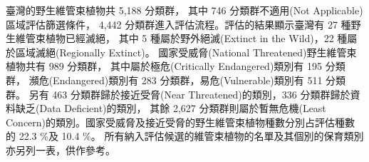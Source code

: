 
\indent 臺灣的野生維管束植物共 5,188 分類群，
其中 746 分類群不適用(Not Applicable)區域評估篩選條件，
4,442 分類群進入評估流程。評估的結果顯示臺灣有 27 種野生維管束植物已經滅絕，
其中 5 種屬於野外絕滅(Extinct in the Wild)，22 種屬於區域滅絕(Regionally Extinct)。
國家受威脅(National Threatened)野生維管束植物共有 989 分類群，
其中屬於極危(Critically Endangered)類別有 195 分類群，
瀕危(Endangered)類別有 283 分類群，易危(Vulnerable)類別有 511 分類群。
另有 463 分類群歸於接近受脅(Near Threatened)的類別，336 分類群歸於資料缺乏(Data Deficient)的類別，
其餘 2,627 分類群則屬於暫無危機(Least Concern)的類別。國家受威脅及接近受脅的野生維管束植物種數分別占評估種數的 22.3 \%及 10.4 \%。
所有納入評估候選的維管束植物的名單及其個別的保育類別亦另列一表，供作參考。\\
